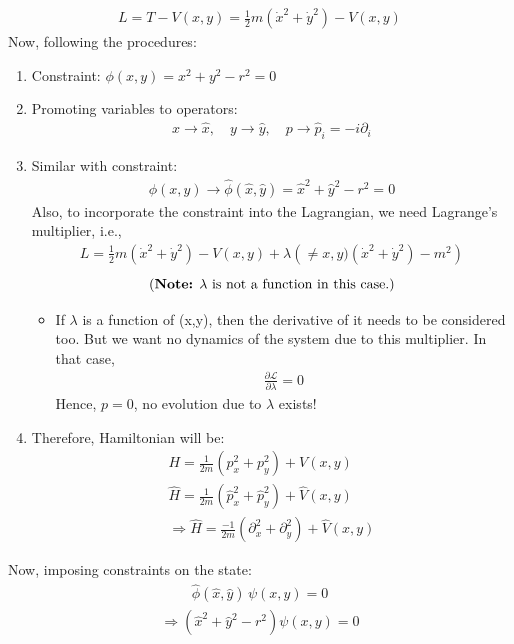 \documentclass[14pt]{article} %
\begin{document}
\begin{align*}
L = T - V(x,y)= \frac{1}{2}m\left( \dot{x}^2 + \dot{y}^2 \right) - V(x,y) \tag{6} \label{eq:6}
\end{align*}
Now, following the procedures:
\begin{enumerate}
    \item Constraint: \quad $\phi(x,y) = x^2 + y^2 - r^2 = 0$
    \item Promoting variables to operators:
\begin{align*}
    x \rightarrow \hat{x}, \quad y \rightarrow \hat{y}, \quad p \rightarrow \hat{p}_i = -i \partial_i
\end{align*}
    \item Similar with constraint: 
\begin{align*}
    \phi(x,y) \rightarrow \hat{\phi}(\hat{x},\hat{y}) = \hat{x}^2 + \hat{y}^2 - r^2 = 0
\end{align*}
    Also, to incorporate the constraint into the Lagrangian, we need Lagrange's multiplier, i.e.,
\begin{align*}
L = \frac{1}{2} m (\dot{x}^2 + \dot{y}^2) - V(x,y) + \lambda \left(\neq x,y)(\dot{x}^2 + \dot{y}^2) - m^2 \right)
\end{align*}
$$ \text{(\textbf{Note:} $\lambda$ is not a function in this case.)} $$
\begin{itemize}
\item If $\lambda$ is a function of (x,y), then the derivative of it needs to be considered too. But we want no dynamics of the system due to this multiplier. In that case,
\begin{align*}
\frac{\partial \mathcal{L}}{\partial \lambda} = 0
\end{align*}
Hence, $p = 0$, no evolution due to $\lambda$ exists!
\end{itemize}
    
    \item Therefore, Hamiltonian will be:
    \begin{align*}
        H = \frac{1}{2m}\left( p_x^2 + p_y^2 \right) + V(x,y) \tag{7} \label{eq:7} \\
        \hat{H} = \frac{1}{2m}\left( \hat{p}_x^2 + \hat{p}_y^2 \right) + \hat{V}(x,y) \\
        \Rightarrow \hat{H} = \frac{-1}{2m}\left( \partial_x^2 + \partial_y^2 \right) + \hat{V}(x,y)
    \end{align*}
\end{enumerate}
Now, imposing constraints on the state:
\begin{align*}
\hat{\phi}(\hat{x},\hat{y}) \, \psi(x,y) = 0
\end{align*}
\begin{align*}
\Rightarrow \left( \hat{x}^2 + \hat{y}^2 - r^2 \right) \psi(x,y) = 0
\end{align*}
\end{document}
